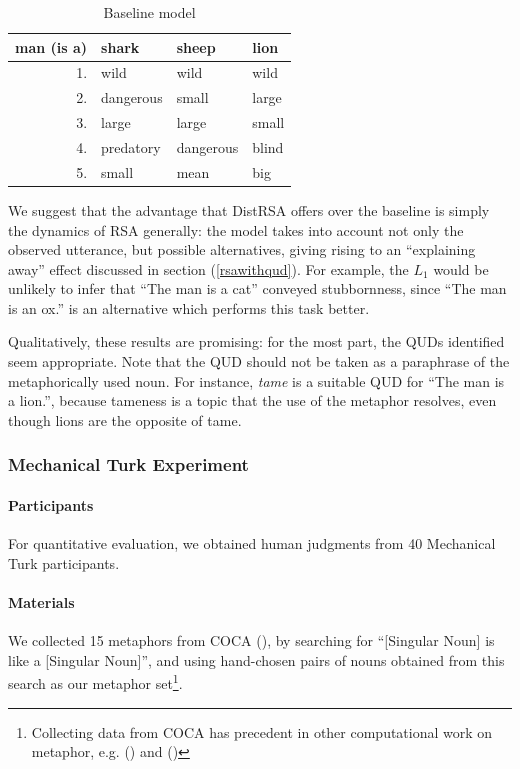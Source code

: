 \documentclass[10pt,letterpaper,twocolumn]{article}
\begin{document}
\begin{table}[ht]
	\label{tab:baseline}
	\caption{Baseline model}
	\centering
	\begin{tabular}{rlll}
	man (is a) & shark & sheep & lion \\\toprule
	1. & wild & wild & wild \\
	2. & dangerous & small & large \\
	3. & large & large & small \\
	4. & predatory & dangerous & blind \\
	5. & small & mean & big \\\bottomrule
	\end{tabular}
\end{table}



We suggest that the advantage that DistRSA offers over the baseline is simply the dynamics of RSA generally: the model takes into account not only the observed utterance, but possible alternatives, giving rising to an ``explaining away'' effect discussed in section (\ref{rsawithqud}). For example, the $L_1$ would be unlikely to infer that ``The man is a cat'' conveyed stubbornness, since ``The man is an ox.'' is an alternative which performs this task better.

Qualitatively, these results are promising: for the most part, the QUDs identified seem appropriate. Note that the QUD should not be taken as a paraphrase of the metaphorically used noun. For instance, \emph{tame} is a suitable QUD for ``The man is a lion.'', because tameness is a topic that the use of the metaphor resolves, even though lions are the opposite of tame. 

\subsubsection{Mechanical Turk Experiment}

\paragraph{Participants} For quantitative evaluation, we obtained human judgments from 40 Mechanical Turk participants. 


\paragraph{Materials} We collected 15 metaphors from COCA (\cite{davies2008corpus}), by searching for ``[Singular Noun] is like a [Singular Noun]'', and using hand-chosen pairs of nouns obtained from this search as our metaphor set\footnote{Collecting data from COCA has precedent in other computational work on metaphor, e.g. (\cite{neuman2013metaphor}) and (\cite{turney2011literal})}.
\end{document}
